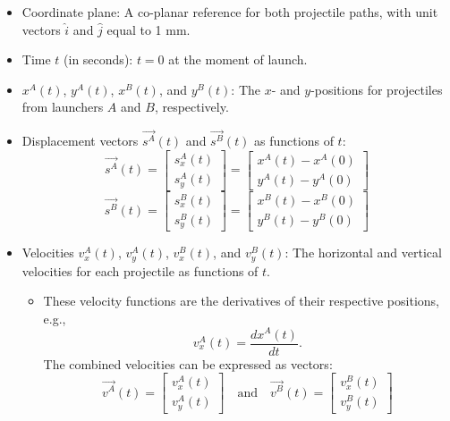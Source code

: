 \documentclass[12pt]{article}
\begin{document}
\begin{itemize}
    \item Coordinate plane: A co-planar reference for both projectile paths, with unit vectors $\hat{i}$ and $\hat{j}$ equal to 1 mm.
    \item Time \(t\) (in seconds): \(t = 0\) at the moment of launch.
    \item \(x^A(t)\), \(y^A(t)\), \(x^B(t)\), and \(y^B(t)\): The \(x\)- and \(y\)-positions for projectiles from launchers \(A\) and \(B\), respectively.
    \item Displacement vectors \(\vec{s^A}(t)\) and \(\vec{s^B}(t)\) as functions of \(t\):
    \[
    \vec{s^A}(t) = \begin{bmatrix} s^A_x(t) \\ s^A_y(t) \end{bmatrix} = \begin{bmatrix} x^A(t) - x^A(0) \\ y^A(t) - y^A(0) \end{bmatrix} 
    \]
    \[
    \vec{s^B}(t) = \begin{bmatrix} s^B_x(t) \\ s^B_y(t) \end{bmatrix} = \begin{bmatrix} x^B(t) - x^B(0) \\ y^B(t) - y^B(0) \end{bmatrix}
    \]
    \item Velocities \(v_x^A(t)\), \(v_y^A(t)\), \(v_x^B(t)\), and \(v_y^B(t)\): The horizontal and vertical velocities for each projectile as functions of \(t\).
    
    \begin{itemize}
        \item These velocity functions are the derivatives of their respective positions, e.g., 
        \[
        v_x^A(t) = \frac{d x^A(t)}{dt}.
        \]
        The combined velocities can be expressed as vectors:
        \[
        \vec{v^A}(t)= \begin{bmatrix} v_x^A(t) \\ v_y^A(t) \end{bmatrix} \quad \text{and} \quad \vec{v^B}(t)= \begin{bmatrix} v_x^B(t) \\ v_y^B(t) \end{bmatrix}
        \]
    \end{itemize}


\end{itemize}
\end{document}
